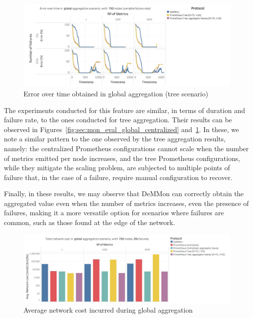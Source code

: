 \begin{figure}
    \centering
    \includegraphics[width=\linewidth]{Chapters/evaluation/figures/aggregation/Error_over_time_global_tree.jpeg}
    \caption{Error over time obtained in global aggregation (tree scenario)}
    \label{fig:sec:mon_eval_global_tree}
\end{figure}

The experiments conducted for this feature are similar, in terms of duration and failure rate, to the ones conducted for tree aggregation. Their results can be observed in Figures~\ref{fig:sec:mon_eval_global_centralized} and~\ref{fig:sec:mon_eval_global_tree}. In these, we note a similar pattern to the one observed by the tree aggregation results, namely: the centralized Prometheus configurations cannot scale when the number of metrics emitted per node increases, and the tree Prometheus configurations, while they mitigate the scaling problem, are subjected to multiple points of failure that, in the case of a failure, require manual configuration to recover. 

Finally, in these results, we may observe that DeMMon can correctly obtain the aggregated value even when the number of metrics increases, even the presence of failures, making it a more versatile option for scenarios where failures are common, such as those found at the edge of the network.

\begin{figure}
    \centering
    \includegraphics[width=\linewidth]{Chapters/evaluation/figures/aggregation/network_cost_global.jpg}
    \caption{Average network cost incurred during global aggregation}
    \label{fig:sec:mon_eval_global_net_cost}
\end{figure}

